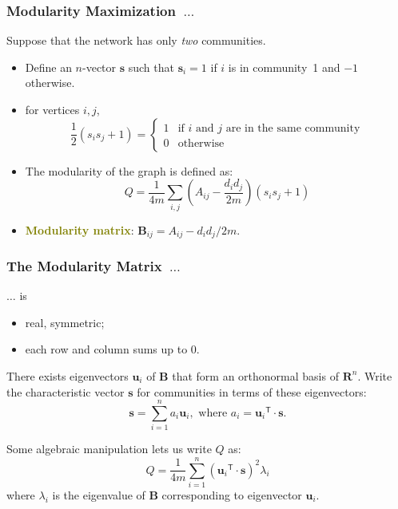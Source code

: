 \documentclass[xcolor=table]{beamer}
\newcommand{\highlight}[1]{\textcolor{olive}{\textbf{#1}}}
\newcommand{\trans}[1]{\ensuremath{{#1}^{\scriptscriptstyle \mathsf{T}}}}
\newcommand{\vect}[1]{\ensuremath{\boldsymbol{#1}}}
\begin{document}
\begin{frame}[t]
\frametitle{Modularity Maximization~$\ldots$}
Suppose that the network has only \emph{two} communities. 
\begin{itemize}
	\item Define an $n$-vector $\vect{s}$ such that $\vect{s}_i = 1$ if $i$ 
		is in community~1 and $-1$ otherwise.

	\item for vertices $i, j$, 
	\[
		\frac{1}{2}(s_i s_j + 1) = \left \{ \begin{array}{ll}
											1 & \mbox{if $i$ and $j$ are in the same community} \\
											0 & \mbox{otherwise}
											\end{array} \right .
	\]

	\item The modularity of the graph is defined as:
	\[
		Q = \frac{1}{4m} \sum_{i, j} \left ( A_{i j} - \frac{d_i d_j}{2m} \right ) (s_i s_j + 1) 
	\]

	\item \highlight{Modularity matrix}: $\vect{B}_{i j} = A_{i j} - d_i d_j / 2m$.
\end{itemize}
\end{frame}

\begin{frame}[t]
\frametitle{The Modularity Matrix~$\ldots$}
$\ldots$ is
\begin{itemize}
	\item real, symmetric;
	\item each row and column sums up to 0.
\end{itemize}

There exists eigenvectors $\vect{u}_i$ of $\vect{B}$ that form an orthonormal basis of $\mathbf{R}^n$.
Write the characteristic vector $\vect{s}$ for communities in terms of these eigenvectors:
\[
	\vect{s} = \sum_{i = 1}^{n} a_i \vect{u}_i, \mbox{ where } a_i = \trans{\vect{u}_i} \cdot \vect{s}. 
\]

Some algebraic manipulation lets us write $Q$ as:
 \[
 	Q = \frac{1}{4m} \sum_{i = 1}^{n}\left ( \trans{\vect{u}_i} \cdot \vect{s} \right )^2 \lambda_i
\]
where $\lambda_i$ is the eigenvalue of $\vect{B}$ corresponding to eigenvector $\vect{u}_i$.
\end{frame}
\end{document}
